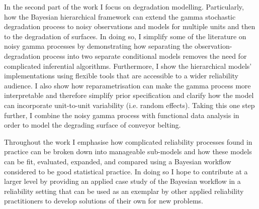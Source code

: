 In the second part of the work I focus on degradation modelling. Particularly, how the Bayesian hierarchical framework can extend the gamma stochastic degradation process to noisy observations and models for multiple units and then to the degradation of surfaces. In doing so, I simplify some of the literature on noisy gamma processes by demonstrating how separating the observation-degradation process into two separate conditional models removes the need for complicated inferential algorithms. Furthermore, I show the hierarchical models' implementations using flexible tools that are accessible to a wider reliability audience. I also show how reparametrisation can make the gamma process more interpretable and therefore simplify prior specification and clarify how the model can incorporate unit-to-unit variability (i.e. random effects). Taking this one step further, I combine the noisy gamma process with functional data analysis in order to model the degrading surface of conveyor belting.

Throughout the work I emphasise how complicated reliability processes found in practice can be broken down into manageable sub-models and how these models can be fit, evaluated, expanded, and compared using a Bayesian workflow considered to be good statistical practice. In doing so I hope to contribute at a larger level by providing an applied case study of the Bayesian workflow in a reliability setting that can be used as an exemplar by other applied reliability practitioners to develop solutions of their own for new problems.

\vspace*{\fill}
